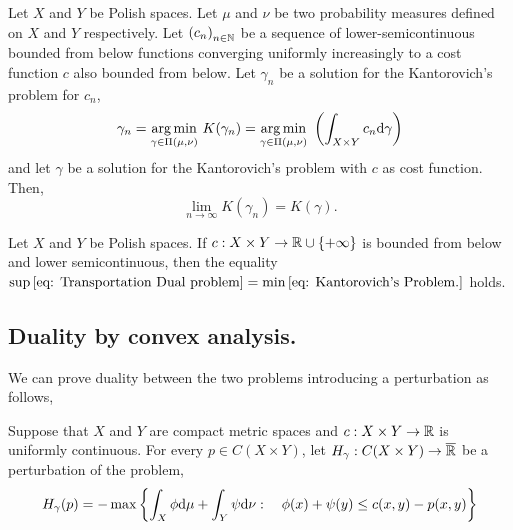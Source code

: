 \begin{lemma}[Stability]
	Let $X$ and $Y$ be Polish spaces. Let $\mu$ and $\nu$ be two probability measures defined on $X$ and $Y$ respectively. Let $\left( c_n \right)_{n\in \mathbb{N}}$ be a sequence of lower-semicontinuous bounded from below functions converging uniformly increasingly to a cost function $c$ also bounded from below. Let $\gamma_n$ be a solution for the Kantorovich's problem for $c_n$,
	\begin{equation*}
		\gamma_n=\displaystyle {\underset {\gamma\in \Pi(\mu, \nu)}{\operatorname {arg\,min} }}\ K(\gamma_n)=\displaystyle {\underset {\gamma\in \Pi(\mu, \nu)}{\operatorname {arg\,min} }}\  \left( \int_{X\times Y}c_n\mathrm{d}\gamma \right)
	\end{equation*}
	and let $\gamma$ be a solution for the Kantorovich's problem with $c$ as cost function. Then,
	\begin{equation*}
		\lim_{n\rightarrow \infty}K(\gamma_n)=K(\gamma).
	\end{equation*}
\end{lemma}

\begin{theorem}
	Let $X$ and $Y$ be Polish spaces. If $c:X\times Y\rightarrow \mathbb{R} \cup\left\lbrace +\infty \right\rbrace$ is bounded from below and lower semicontinuous, then the equality $\sup\eqref{eq: Transportation Dual problem}=\min\eqref{eq: Kantorovich's Problem.}$ holds.
\end{theorem}	
\subsection{Duality by convex analysis.}
We can prove duality between the two problems introducing a perturbation as follows, 
\begin{definition}
	\label{def: H perturbation}
	Suppose that $X$ and $Y$ are compact metric spaces and $c:X\times Y\rightarrow \mathbb{R}$ is uniformly continuous. For every $p\in C(X\times Y)$, let $H_\gamma:C(X\times Y)\rightarrow \overline{\mathbb{R}}$ be a perturbation of the problem,
	\begin{equation}
	H_\gamma(p)=-\max\left\lbrace \int_X\phi \mathrm{d}\mu + \int_Y\psi \mathrm{d}\nu: \quad \phi(x)+\psi(y)\leq c(x,y)-p(x,y) \right\rbrace
	\end{equation}	
\end{definition}

